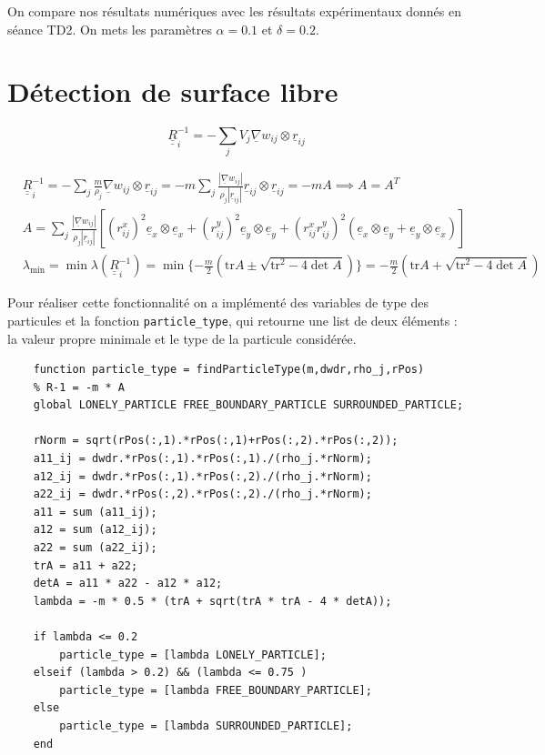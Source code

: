 \documentclass{article}
\newcommand\ul[1]{\underline{#1}}
\newcommand\uul[1]{\underline{\underline{#1}}}
\newcommand\uex{\ul{e}_x}
\newcommand\uey{\ul{e}_y}
\begin{document}
On compare nos résultats numériques avec les résultats expérimentaux donnés en séance TD2. On mets les paramètres $\alpha=0.1$ et $\delta=0.2$.\\ 
     
\section{Détection de surface libre}

\begin{equation}
	\uul{R}_i^{-1} = - \sum_{j} V_j \ul{\nabla} w_{ij} \otimes \ul{r}_{ij}
\end{equation}

\begin{align*}
	& \uul{R}_i^{-1} = - \sum_{j} \frac{m}{\rho_j} \ul{\nabla} w_{ij} \otimes \ul{r}_{ij} = - m \sum_{j} 
	\frac{| \ul{\nabla} w_{ij} |}{\rho_j |\ul{r}_{ij} |} \ul{r}_{ij} \otimes \ul{r}_{ij} = -m A \implies A = A^T \\
	& A = \sum_j \frac{| \ul{\nabla} w_{ij} |}{\rho_j |\ul{r}_{ij} |} \left[ (r_{ij}^x)^2 \uex \otimes \uex + (r_{ij}^y)^2 \uey \otimes \uey + (r_{ij}^x r_{ij}^y)^2 (\uex \otimes \uey + \uey \otimes \uex) \right] \\ 
	& \lambda_{\min} = \min\lambda(\uul{R}_i^{-1}) = \min\{ -\frac{m}{2} (\mathrm{tr} A \pm \sqrt{\mathrm{tr}^2 - 4 \det A}) \} = -\frac{m}{2} (\mathrm{tr} A + \sqrt{\mathrm{tr}^2 - 4 \det A})
\end{align*}

Pour réaliser cette fonctionnalité on a implémenté des variables de type des particules et la fonction \lstinline$particle_type$, qui retourne une list de deux éléments : la valeur propre minimale et le type de la particule considérée.  
\lstset{language=matlab}   
\begin{lstlisting}           
	function particle_type = findParticleType(m,dwdr,rho_j,rPos)
    % R-1 = -m * A 
    global LONELY_PARTICLE FREE_BOUNDARY_PARTICLE SURROUNDED_PARTICLE;

    rNorm = sqrt(rPos(:,1).*rPos(:,1)+rPos(:,2).*rPos(:,2)); 
    a11_ij = dwdr.*rPos(:,1).*rPos(:,1)./(rho_j.*rNorm); 
    a12_ij = dwdr.*rPos(:,1).*rPos(:,2)./(rho_j.*rNorm); 
    a22_ij = dwdr.*rPos(:,2).*rPos(:,2)./(rho_j.*rNorm); 
    a11 = sum (a11_ij);
    a12 = sum (a12_ij);
    a22 = sum (a22_ij);
    trA = a11 + a22;
    detA = a11 * a22 - a12 * a12;
    lambda = -m * 0.5 * (trA + sqrt(trA * trA - 4 * detA));

    if lambda <= 0.2 
        particle_type = [lambda LONELY_PARTICLE];
    elseif (lambda > 0.2) && (lambda <= 0.75 ) 
        particle_type = [lambda FREE_BOUNDARY_PARTICLE];
    else 
        particle_type = [lambda SURROUNDED_PARTICLE];
    end
\end{lstlisting} 
\end{document}
